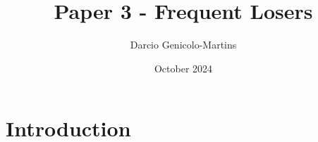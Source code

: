 \documentclass{article}
\title{Paper 3 - Frequent Losers}
\author{Darcio Genicolo-Martins}
\date{October 2024}
\begin{document}
\maketitle

\section{Introduction}
\end{document}
